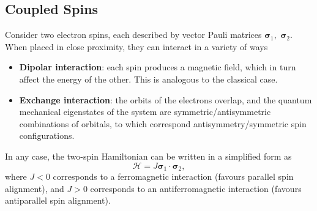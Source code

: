 \documentclass{article}
\begin{document}
\subsection{Coupled Spins}
Consider two electron spins, each described by vector Pauli matrices $\mathbf{\sigma }_1,$ $\mathbf{\sigma }_2$. When placed in close proximity, they can interact in a variety of ways
\begin{itemize}
    \item \textbf{Dipolar interaction}: each spin produces a magnetic field, which in turn affect the energy of the other. This is analogous to the classical case.
    \item \textbf{Exchange interaction}: the orbits of the electrons overlap, and the quantum mechanical eigenstates of the system are symmetric/antisymmetric combinations of orbitals, to which correspond antisymmetry/symmetric spin configurations.
\end{itemize}
In any case, the two-spin Hamiltonian can be written in a simplified form as
\[
    \mathcal{H}=J\mathbf{\sigma }_1\cdot\mathbf{\sigma }_2,
\]
where $J<0$ corresponds to a ferromagnetic interaction (favours parallel spin alignment), and $J>0$ corresponds to an antiferromagnetic interaction (favours antiparallel spin alignment).
\end{document}
